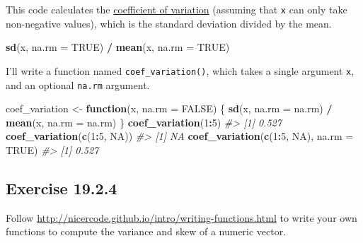 \documentclass[]{book}
\newenvironment{Shaded}{\begin{snugshade}}{\end{snugshade}}
\newcommand{\CommentTok}[1]{\textcolor[rgb]{0.56,0.35,0.01}{\textit{#1}}}
\newcommand{\ControlFlowTok}[1]{\textcolor[rgb]{0.13,0.29,0.53}{\textbf{#1}}}
\newcommand{\DataTypeTok}[1]{\textcolor[rgb]{0.13,0.29,0.53}{#1}}
\newcommand{\DecValTok}[1]{\textcolor[rgb]{0.00,0.00,0.81}{#1}}
\newcommand{\KeywordTok}[1]{\textcolor[rgb]{0.13,0.29,0.53}{\textbf{#1}}}
\newcommand{\NormalTok}[1]{#1}
\newcommand{\OperatorTok}[1]{\textcolor[rgb]{0.81,0.36,0.00}{\textbf{#1}}}
\newcommand{\OtherTok}[1]{\textcolor[rgb]{0.56,0.35,0.01}{#1}}
\newcommand{\StringTok}[1]{\textcolor[rgb]{0.31,0.60,0.02}{#1}}
\theoremstyle{plain}
\theoremstyle{remark}
\theoremstyle{definition}
\theoremstyle{definition}
\theoremstyle{definition}
\theoremstyle{remark}
\begin{document}
This code calculates the
\href{https://en.wikipedia.org/wiki/Coefficient_of_variation}{coefficient
of variation} (assuming that \texttt{x} can only take non-negative
values), which is the standard deviation divided by the mean.

\begin{Shaded}
\begin{Highlighting}[]
\KeywordTok{sd}\NormalTok{(x, }\DataTypeTok{na.rm =} \OtherTok{TRUE}\NormalTok{) }\OperatorTok{/}\StringTok{ }\KeywordTok{mean}\NormalTok{(x, }\DataTypeTok{na.rm =} \OtherTok{TRUE}\NormalTok{)}
\end{Highlighting}
\end{Shaded}

I'll write a function named \texttt{coef\_variation()}, which takes a
single argument \texttt{x}, and an optional \texttt{na.rm} argument.

\begin{Shaded}
\begin{Highlighting}[]
\NormalTok{coef_variation <-}\StringTok{ }\ControlFlowTok{function}\NormalTok{(x, }\DataTypeTok{na.rm =} \OtherTok{FALSE}\NormalTok{) \{}
  \KeywordTok{sd}\NormalTok{(x, }\DataTypeTok{na.rm =}\NormalTok{ na.rm) }\OperatorTok{/}\StringTok{ }\KeywordTok{mean}\NormalTok{(x, }\DataTypeTok{na.rm =}\NormalTok{ na.rm)}
\NormalTok{\}}
\KeywordTok{coef_variation}\NormalTok{(}\DecValTok{1}\OperatorTok{:}\DecValTok{5}\NormalTok{)}
\CommentTok{#> [1] 0.527}
\KeywordTok{coef_variation}\NormalTok{(}\KeywordTok{c}\NormalTok{(}\DecValTok{1}\OperatorTok{:}\DecValTok{5}\NormalTok{, }\OtherTok{NA}\NormalTok{))}
\CommentTok{#> [1] NA}
\KeywordTok{coef_variation}\NormalTok{(}\KeywordTok{c}\NormalTok{(}\DecValTok{1}\OperatorTok{:}\DecValTok{5}\NormalTok{, }\OtherTok{NA}\NormalTok{), }\DataTypeTok{na.rm =} \OtherTok{TRUE}\NormalTok{)}
\CommentTok{#> [1] 0.527}
\end{Highlighting}
\end{Shaded}

\hypertarget{exercise-19.2.4}{%
\subsection*{\texorpdfstring{Exercise
{19.2.4}}{Exercise 19.2.4}}\label{exercise-19.2.4}}

Follow \url{http://nicercode.github.io/intro/writing-functions.html} to
write your own functions to compute the variance and skew of a numeric
vector.
\end{document}
